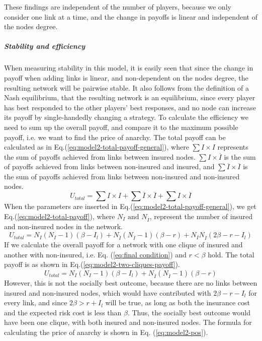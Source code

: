 These findings are independent of the number of players, because we only consider one link at a time, and the change in payoffs is linear and independent of the nodes degree.

\subparagraph{Stability and efficiency}
When measuring stability in this model, it is easily seen that since the change in payoff when adding links is linear, and non-dependent on the nodes degree, the resulting network will be pairwise stable. 
It also follows from the definition of a Nash equilibrium, that the resulting network is an equilibrium, since every player has best responded to the other players' best responses, and no node can increase its payoff by single-handedly changing a strategy. 
To calculate the efficiency we need to sum up the overall payoff, and compare it to the maximum possible payoff, i.e. we want to find the price of anarchy. The total payoff can be calculated as in Eq.(\ref{eq:model2-total-payoff-general}), where $\sum I \times I$ represents the sum of payoffs achieved from links between insured nodes. $\sum I \times \overline{I}$ is the sum of payoffs achieved from links between non-insured and insured, and $\sum \overline{I} \times \overline{I}$ is the sum of payoffs achieved from links between non-insured and non-insured nodes. 
\begin{equation}
U_{total}=\sum I \times I+\sum \overline{I}\times\overline{I}+\sum I\times\overline{I}
\label{eq:model2-total-payoff-general}
\end{equation}
When the parameters are inserted in Eq.(\ref{eq:model2-total-payoff-general}), we get Eq.(\ref{eq:model2-total-payoff}), where $N_{I} \text{ and } N_{\overline{I}}$, represent the number of insured and non-insured nodes in the network.
\begin{equation}
U_{total}=N_{I}(N_{I}-1)(\beta-I_{l})+N_{\overline{I}}(N_{\overline{I}}-1)(\beta-r)+N_{I}N_{\overline{I}}(2\beta-r-I_{l})
\label{eq:model2-total-payoff}
\end{equation}
If we calculate the overall payoff for a network with one clique of insured and another with non-insured, i.e. Eq. (\ref{eq:final condition}) and $r<\beta$ hold. The total payoff is as shown in Eq.(\ref{eq:model2-two-cliques-payoff}).
\begin{equation}
U_{total}=N_{I}(N_{I}-1)(\beta-I_{l})+N_{\overline{I}}(N_{\overline{I}}-1)(\beta-r)
\label{eq:model2-two-cliques-payoff}
\end{equation}
However, this is not the socially best outcome, because there are no links between insured and non-insured nodes, which would have contributed with $2\beta-r-I_{l}$ for every link, and since $2\beta>r+I_{l}$ will be true, as long as both the insurance cost and the expected risk cost is less than $\beta$. Thus, the socially best outcome would have been one clique, with both insured and non-insured nodes. The formula for calculating the price of anarchy is shown in Eq. (\ref{eq:model2-pos}).
